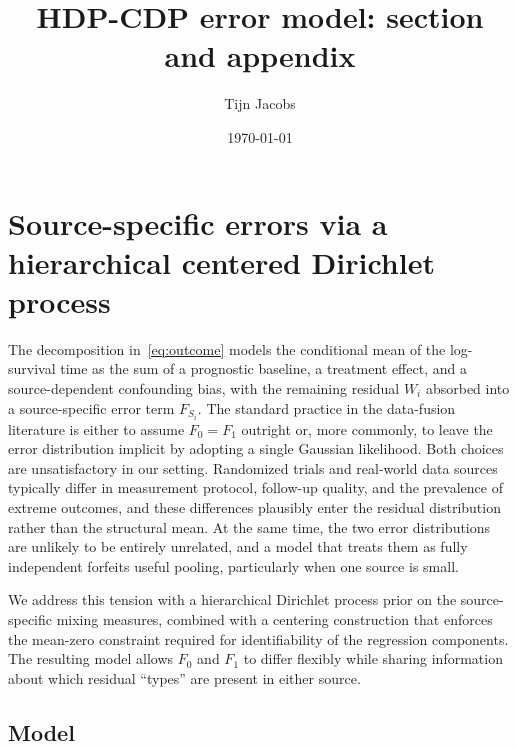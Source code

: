\documentclass[11pt]{article}
\title{HDP-CDP error model: section and appendix}
\author{Tijn Jacobs}
\date{\today}
\theoremstyle{plain}
\theoremstyle{definition}
\theoremstyle{remark}
\newcommand{\1}{\mathds{1}}
\begin{document}

\section{Source-specific errors via a hierarchical centered Dirichlet process}
\label{sec:hdp}

The decomposition in~\eqref{eq:outcome} models the conditional mean of the log-survival time as the sum of a prognostic baseline, a treatment effect, and a source-dependent confounding bias, with the remaining residual $W_i$ absorbed into a source-specific error term $F_{S_i}$. The standard practice in the data-fusion literature is either to assume $F_0 = F_1$ outright or, more commonly, to leave the error distribution implicit by adopting a single Gaussian likelihood. Both choices are unsatisfactory in our setting. Randomized trials and real-world data sources typically differ in measurement protocol, follow-up quality, and the prevalence of extreme outcomes, and these differences plausibly enter the residual distribution rather than the structural mean. At the same time, the two error distributions are unlikely to be entirely unrelated, and a model that treats them as fully independent forfeits useful pooling, particularly when one source is small.

We address this tension with a hierarchical Dirichlet process \citep{teh2006hierarchical} prior on the source-specific mixing measures, combined with a centering construction \citep{yang2010semiparametric} that enforces the mean-zero constraint required for identifiability of the regression components. The resulting model allows $F_0$ and $F_1$ to differ flexibly while sharing information about which residual ``types'' are present in either source.

\subsection{Model}
\label{sec:hdp-model}
\end{document}

